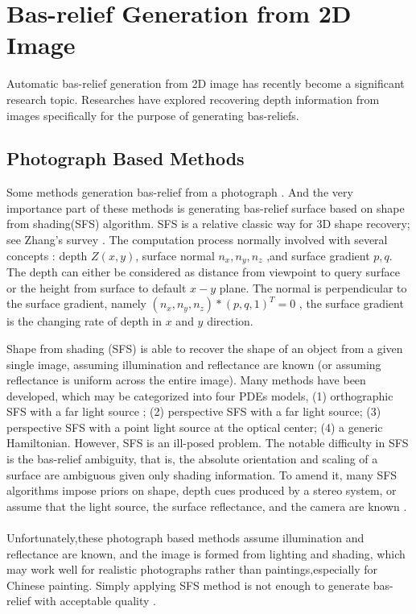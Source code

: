\section{Bas-relief Generation from 2D Image}\label{ref2dimage}
Automatic bas-relief generation from 2D image has recently become a significant research topic. Researches have explored recovering depth information from images specifically for the purpose of generating bas-reliefs.\newline
\subsection{Photograph Based Methods}
Some methods generation bas-relief from a photograph \cite{zeng2014region}\cite{wu2013making} \cite{alexa2010reliefs}\cite{wu2008interactive}. And the very importance part of these methods is generating bas-relief surface based on shape from shading(SFS) algorithm. SFS is a relative classic way for 3D shape recovery; see Zhang's survey \cite{zhang1999shape}.  The computation process normally involved with several concepts : depth $Z(x,y)$, surface normal $n_x,n_y,n_z$ ,and surface gradient $p,q$. The depth can either be considered as distance from viewpoint to query surface or the height from surface to default $x-y$ plane. The normal is perpendicular to the surface gradient, namely $\left( n_x,n_y,n_z\right) * \left( p, q ,1\right)^T =0  $ , the surface gradient is the changing rate of depth in $x$ and $y$ direction.

Shape from shading (SFS) is able to recover the shape of an object from a given single image, assuming illumination and reflectance are known (or assuming reflectance is uniform across the entire image). Many methods have been developed, which may be categorized into four PDEs models\cite{prados2003perspective}, (1) orthographic SFS with a far light source \cite{lions1993shape}; (2) perspective SFS with a far light source\cite{prados2004unifying}; (3) perspective SFS with a point light source at the optical center\cite{prados2003perspective}; (4) a generic Hamiltonian. However, SFS is an ill-posed problem. The notable difficulty in SFS is the bas-relief ambiguity\cite{belhumeur1999bas}, that is, the absolute orientation and scaling of a surface are ambiguous given only shading information. To amend it, many SFS algorithms impose priors on shape, depth cues produced by a stereo system, or assume that the light source, the surface reflectance, and the camera are known\cite{zhang1999shape} \cite{alldrin2007resolving} \cite{johnson2011shape} \cite{barron2012color}.\\ \\
Unfortunately,these photograph based methods assume  illumination and reflectance are known, and the image is formed from lighting and shading, which may work well for realistic photographs rather than paintings,especially for Chinese painting. Simply applying SFS method is not enough to generate bas-relief with acceptable quality .  

